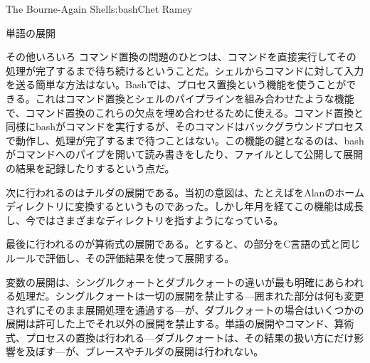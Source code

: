 \begin{aosachapter}{The Bourne-Again Shell}{s:bash}{Chet Ramey}
\begin{aosasect1}{単語の展開}
\begin{aosasect2}{その他いろいろ}
コマンド置換の問題のひとつは、コマンドを直接実行してその処理が完了するまで待ち続けるということだ。シェルからコマンドに対して入力を送る簡単な方法はない。Bashでは、プロセス置換という機能を使うことができる。これはコマンド置換とシェルのパイプラインを組み合わせたような機能で、コマンド置換のこれらの欠点を埋め合わせるために使える。コマンド置換と同様にbashがコマンドを実行するが、そのコマンドはバックグラウンドプロセスで動作し、処理が完了するまで待つことはない。この機能の鍵となるのは、bashがコマンドへのパイプを開いて読み書きをしたり、ファイルとして公開して展開の結果を記録したりするという点だ。

次に行われるのはチルダの展開である。当初の意図は、たとえばをAlanのホームディレクトリに変換するというものであった。しかし年月を経てこの機能は成長し、今ではさまざまなディレクトリを指すようになっている。

最後に行われるのが算術式の展開である。とすると、の部分をC言語の式と同じルールで評価し、その評価結果を使って展開する。

変数の展開は、シングルクォートとダブルクォートの違いが最も明確にあらわれる処理だ。シングルクォートは一切の展開を禁止する---囲まれた部分は何も変更されずにそのまま展開処理を通過する---が、ダブルクォートの場合はいくつかの展開は許可した上でそれ以外の展開を禁止する。単語の展開やコマンド、算術式、プロセスの置換は行われる---ダブルクォートは、その結果の扱い方にだけ影響を及ぼす---が、ブレースやチルダの展開は行われない。


\end{aosasect2}
\end{aosasect1}
\end{aosachapter}
